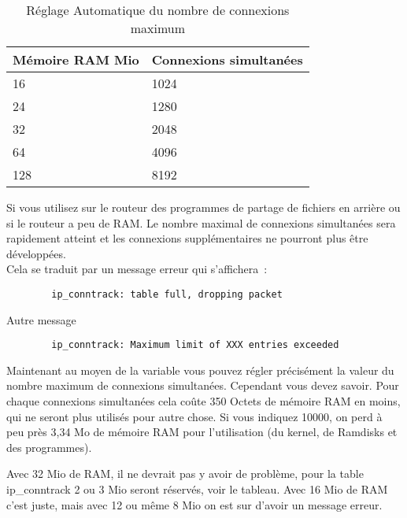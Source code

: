 \begin{description}
    \begin{table}[ht!]
        \centering
        \caption{Réglage Automatique du nombre de connexions maximum}
        \begin{tabular}{p{6cm}p{6cm}}
          Mémoire RAM Mio   &    Connexions simultanées \\\hline
          16                      &    1024 \\
          24                      &    1280 \\
          32                      &    2048 \\
          64                      &    4096 \\
          128                     &    8192 \\
        \end{tabular}
    \end{table}

  Si vous utilisez sur le routeur des programmes de partage de fichiers en 
  arrière ou si le routeur a peu de RAM. Le nombre maximal de connexions 
  simultanées sera rapidement atteint et les connexions supplémentaires ne
  pourront plus être développées.\\
  Cela se traduit par un message erreur qui s'affichera~:

\begin{example}
\begin{verbatim}
        ip_conntrack: table full, dropping packet
\end{verbatim}
\end{example}

   Autre message

\begin{example}
\begin{verbatim}
        ip_conntrack: Maximum limit of XXX entries exceeded
\end{verbatim}
\end{example}

    Maintenant au moyen de la variable  vous pouvez
    régler précisément la valeur du nombre maximum de connexions simultanées.
    Cependant vous devez savoir. Pour chaque connexions simultanées cela coûte
    350 Octets de mémoire RAM en moins, qui ne seront plus utilisés pour autre
    chose. Si vous indiquez 10000, on perd à peu près 3,34 Mo de mémoire RAM
    pour l'utilisation (du kernel, de Ramdisks et des programmes).

    Avec 32 Mio de RAM, il ne devrait pas y avoir de problème, pour la table
    ip\_conntrack 2 ou 3 Mio seront réservés, voir le tableau. Avec 16 Mio de
    RAM c'est juste, mais avec 12 ou même 8 Mio on est sur d'avoir un message erreur.


\end{description}
